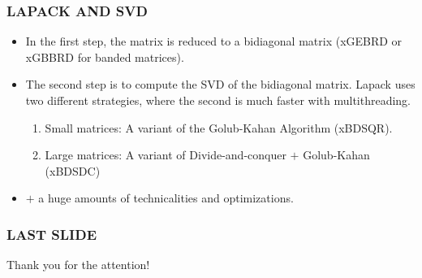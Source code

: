 \documentclass[a4paper,8pt]{beamer} %
\begin{document}
\begin{frame}%
\frametitle{LAPACK AND SVD}
\begin{itemize}
	\item In the first step, the matrix is reduced to a bidiagonal matrix 
		(xGEBRD or xGBBRD for banded matrices).
	\item The second step is to compute the SVD of the bidiagonal matrix. 
		Lapack uses two different strategies, where the second is much faster with multithreading.
		\begin{enumerate}
			\item Small matrices: A variant of the Golub-Kahan Algorithm (xBDSQR).
			\item Large matrices: A variant of Divide-and-conquer $+$ Golub-Kahan (xBDSDC)
		\end{enumerate}
	\item $+$ a huge amounts of technicalities and optimizations.
\end{itemize}
\end{frame}%

\begin{frame}%
\frametitle{LAST SLIDE}
	\begin{bf}
		\begin{large}
			\begin{center}
				Thank you for the attention!
			\end{center}
		\end{large}
	\end{bf}
\end{frame}%
\end{document}
